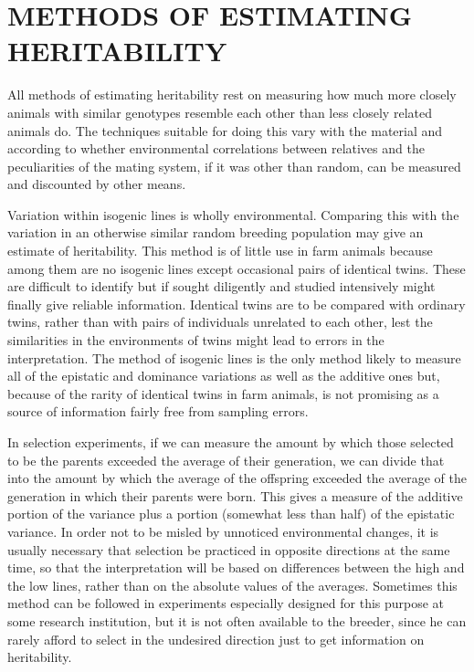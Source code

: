\section*{METHODS OF ESTIMATING HERITABILITY}

All methods of estimating heritability rest on measuring how much
more closely animals with similar genotypes resemble each other than
less closely related animals do. The techniques suitable for doing this
vary with the material and according to whether environmental correlations
between relatives and the peculiarities of the mating system, if it
was other than random, can be measured and discounted by other
means.

Variation within isogenic lines is wholly environmental. Comparing
this with the variation in an otherwise similar random breeding population
may give an estimate of heritability. This method is of little use in
farm animals because among them are no isogenic lines except occasional
pairs of identical twins. These are difficult to identify but if
sought diligently and studied intensively might finally give reliable
information. Identical twins are to be compared with ordinary twins,
rather than with pairs of individuals unrelated to each other, lest the
similarities in the environments of twins might lead to errors in the
interpretation. The method of isogenic lines is the only method likely
to measure all of the epistatic and dominance variations as well as the
additive ones but, because of the rarity of identical twins in farm animals,
is not promising as a source of information fairly free from
sampling errors.

In selection experiments, if we can measure the amount by which
those selected to be the parents exceeded the average of their generation,
we can divide that into the amount by which the average of the
offspring exceeded the average of the generation in which their parents
were born. This gives a measure of the additive portion of the variance
plus a portion (somewhat less than half) of the epistatic variance. In
order not to be misled by unnoticed environmental changes, it is usually
necessary that selection be practiced in opposite directions at the
same time, so that the interpretation will be based on differences
between the high and the low lines, rather than on the absolute values
of the averages. Sometimes this method can be followed in experiments
especially designed for this purpose at some research institution, but it
is not often available to the breeder, since he can rarely afford to select
in the undesired direction just to get information on heritability.

